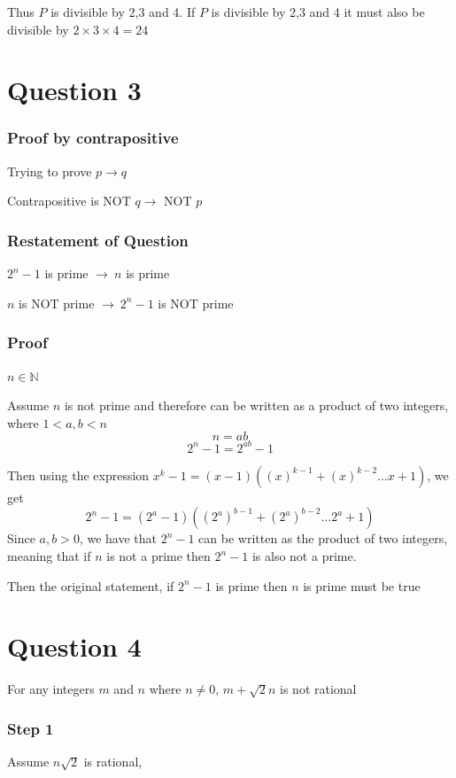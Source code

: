 \documentclass{article}
\begin{document}
Thus \(P\) is divisible by 2,3 and 4.
If \(P\) is divisible by 2,3 and 4 it must also be divisible by \(2\times 3 \times 4 = 24\)


\section*{Question 3}
\subsubsection*{Proof by contrapositive}
Trying to prove \(p \rightarrow q\)

Contrapositive is NOT \(q \rightarrow\) NOT \(p \)

\subsubsection*{Restatement of Question}
\(2^{n}-1\) is prime \(\rightarrow \ n\) is prime

\(n\) is NOT prime \(\rightarrow \ 2^{n}-1\) is NOT prime

\subsubsection*{Proof}
\(n \in \mathbb{N}\)

Assume \(n\) is not prime and therefore can be written as a product of two integers, where \(1<a,b<n\)
\[
n = ab
\]
\[
2^{n}-1 = 2^{ab}-1
\]

Then using the expression \(x^{k}-1 = (x-1)((x)^{k-1}+(x)^{k-2} \dots x+1)\), we get
\[
    2^{n}-1 = (2^a-1)((2^a)^{b-1}+(2^a)^{b-2} \dots 2^a+1)
\]
Since \(a,b > 0 \), we have that \(2^n-1\) can be written as the product of two integers, meaning that if \(n\) is not a prime
then \(2^n-1\) is also not a prime.

Then the original statement, if \(2^n-1\) is prime then \(n\) is prime must be true


\section*{Question 4}
For any integers \(m\) and \(n\) where \(n \neq 0\), \(m+\sqrt{2}n\) is not rational

\subsubsection*{Step 1}

Assume \(n\sqrt{2}\) is rational,
\end{document}
